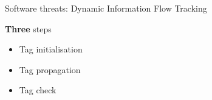 \begin{frame}{Software threats: Dynamic Information Flow Tracking}
    \begin{minipage}[c]{0.35\linewidth}
        \begingroup
        \begin{block}{\textbf{Three} steps}
            \begin{itemize}
                \item<1-> Tag initialisation
                \item<2-> Tag propagation
                \item<3-> Tag check
            \end{itemize}
        \end{block}
        \endgroup
    \end{minipage}\hfill%
    \begin{minipage}[c]{0.6\linewidth}
        \begin{figure}
            \centering
            \label{fig:schemaDIFT}
        \end{figure}
    \end{minipage}
\end{frame}

